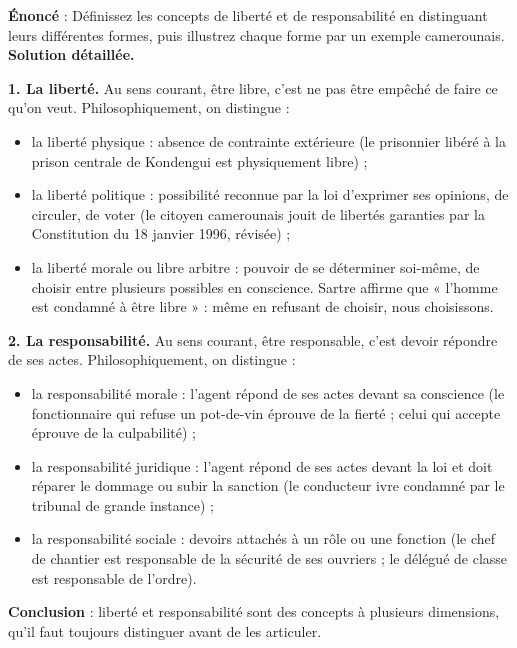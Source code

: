 \documentclass[11pt]{article}
\newcommand{\cle}[1]{{\popxbold\color{popdark}#1}}
\begin{document}
\begin{exoresolu}
\textbf{Énoncé} : Définissez les concepts de liberté et de responsabilité en distinguant leurs différentes formes, puis illustrez chaque forme par un exemple camerounais.
\tcblower
\textbf{Solution détaillée.}

\textbf{1. La liberté.} Au sens courant, être libre, c'est ne pas être empêché de faire ce qu'on veut. Philosophiquement, on distingue :
\begin{itemize}
\item la \cle{liberté physique} : absence de contrainte extérieure (le prisonnier libéré à la prison centrale de Kondengui est physiquement libre) ;
\item la \cle{liberté politique} : possibilité reconnue par la loi d'exprimer ses opinions, de circuler, de voter (le citoyen camerounais jouit de libertés garanties par la Constitution du 18 janvier 1996, révisée) ;
\item la \cle{liberté morale} ou libre arbitre : pouvoir de se déterminer soi-même, de choisir entre plusieurs possibles en conscience. Sartre affirme que « l'homme est condamné à être libre » : même en refusant de choisir, nous choisissons.
\end{itemize}

\textbf{2. La responsabilité.} Au sens courant, être responsable, c'est devoir répondre de ses actes. Philosophiquement, on distingue :
\begin{itemize}
\item la \cle{responsabilité morale} : l'agent répond de ses actes devant sa conscience (le fonctionnaire qui refuse un pot-de-vin éprouve de la fierté ; celui qui accepte éprouve de la culpabilité) ;
\item la \cle{responsabilité juridique} : l'agent répond de ses actes devant la loi et doit réparer le dommage ou subir la sanction (le conducteur ivre condamné par le tribunal de grande instance) ;
\item la \cle{responsabilité sociale} : devoirs attachés à un rôle ou une fonction (le chef de chantier est responsable de la sécurité de ses ouvriers ; le délégué de classe est responsable de l'ordre).
\end{itemize}

\textbf{Conclusion} : liberté et responsabilité sont des concepts à plusieurs dimensions, qu'il faut toujours distinguer avant de les articuler.
\end{exoresolu}
\end{document}
